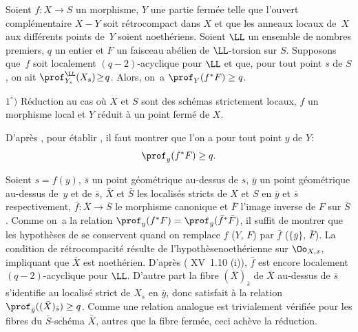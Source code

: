 \begin{corollaire}\label{XIV.1.14}
Soient $f:X\to S$ un morphisme, $Y$ une partie ferm\'ee telle que l'ouvert compl\'ementaire $X- Y$ soit r\'etrocompact dans $X$ et que les anneaux locaux de~$X$ aux diff\'erents points de~$Y$ soient noeth\'eriens. Soient $\LL$ un ensemble de nombres \hbox{premiers}, $q$ un entier et $F$ un faisceau ab\'elien de $\LL$-torsion sur $S$. Supposons que~$f$ soit localement $(q-2)$-acyclique pour $\LL$ et que, pour tout point $s$ de $S$, on ait \hbox{$\prof_{Y_s}^\LL(X_s)\!\geq\! q$}. Alors, on~a $\prof_Y(f^*F)\geq q$.
\end{corollaire}

$1^\circ)$ R\'eduction au cas o\`u $X$ et $S$ sont des sch\'emas strictement locaux, $f$ un morphisme local et $Y$ r\'eduit \`a un point ferm\'e de $X$.

D'apr\`es , pour \'etablir , il faut montrer que l'on a pour tout point $y$ de $Y$:$$
\prof_y(f^*F)\geq q.
$$

Soient $s=f(y)$, $\bar s$ un point g\'eom\'etrique au-dessus de $s$, $\bar y$ un point g\'eom\'etrique au-dessus de~$y$ et de $\bar s$, $\bar X$ et $\bar S$ les localis\'es stricts de $X$ et $S$ en $\bar y$ et $\bar s$ respectivement, $\bar f:\bar X\to\bar S$ le morphisme canonique et $\bar F$ l'image inverse de $F$ sur $\bar S$. Comme on~a la relation $\prof_y(f^*F)=\prof_{\bar y}(\bar f^*\bar F)$, il suffit de montrer que les hypoth\`eses de  se conservent quand on remplace $f$ (\resp $Y$, \resp $F$) par $\bar f$ (\resp $\{\bar y\}$, \resp $\bar F$). La condition de r\'etrocompacit\'e r\'esulte de l'hypoth\`ese\pageoriginale noeth\'erienne sur $\Oo_{X, x}$, impliquant que $\bar X$ est noeth\'erien. D'apr\`es ( XV~1.10 \textup{(i)}), $\bar f$ est encore localement $(q-2)$-acyclique pour $\LL$. D'autre part la fibre $(\bar X)_{\bar s}$ de $\bar X$ au-dessus de $\bar s$ s'identifie au localis\'e strict de $X_s$ en $\bar y$, donc satisfait \`a la relation $\prof_{\bar y}((\bar X)_{\bar s})\geq q$. Comme une relation analogue est trivialement v\'erifi\'ee pour les fibres du $\bar S$-sch\'ema $\bar X$, autres que la fibre ferm\'ee, ceci ach\`eve la r\'eduction.

